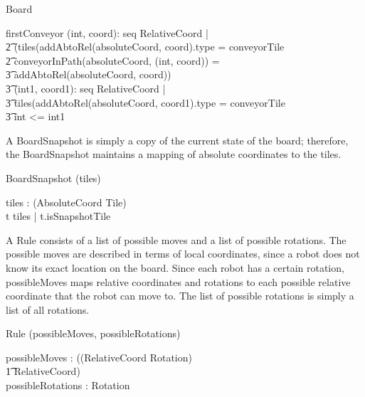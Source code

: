 \documentclass[12pt]{article}
\begin{document}
\begin{class}{Board}
\begin{schema}{firstConveyor}
\exists (int, coord): seq RelativeCoord |  \\ \t2
(tiles(addAbtoRel(absoluteCoord, coord).type = conveyorTile \\ \t2
conveyorInPath(absoluteCoord, (int, coord)) = \\ \t3 addAbtoRel(absoluteCoord, coord)) \implies \\ \t3
\forall (int1, coord1): seq RelativeCoord | \\ \t3
\IF tiles(addAbtoRel(absoluteCoord, coord1).type = conveyorTile \\ \t3
\THEN int <= int1
\end{schema}
\end{class}

A BoardSnapshot is simply a copy of the current state of the board; therefore, the BoardSnapshot maintains a mapping of absolute coordinates to the tiles.
\begin{class}{BoardSnapshot}
\upharpoonright (tiles) \\
\begin{state}
tiles : \power (AbsoluteCoord \fun Tile) \\
\where
\forall t \ran tiles | t.isSnapshotTile
\end{state}
\end{class}

A Rule consists of a list of possible moves and a list of possible rotations. The possible moves are described in terms of local coordinates, since a robot does not know its exact location on the board. Since each robot has a certain rotation, possibleMoves maps relative coordinates and rotations to each possible relative coordinate that the robot can move to. The list of possible rotations is simply a list of all rotations.
\begin{class}{Rule}
\upharpoonright (possibleMoves, possibleRotations) \\
\begin{state}
possibleMoves : \power ((RelativeCoord \times Rotation) \psurj \\ \t1 \seq RelativeCoord) \\
possibleRotations : \power Rotation
\end{state} \\
\end{class}
\end{document}
